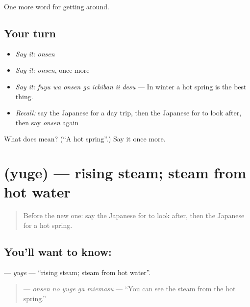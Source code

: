 \begin{grammarlens}[title={What you've built}]
One more word for getting around.
\end{grammarlens}

\subsection*{Your turn}
\begin{itemize}
\raggedright
  \item \emph{Say it:} \emph{onsen}
  \item \emph{Say it:} \emph{onsen}, once more
  \item \emph{Say it:} \emph{fuyu wa onsen ga ichiban ii desu} — In winter a hot spring is the best thing.
  \item \emph{Recall:} say the Japanese for a day trip, then the Japanese for to look after, then say \emph{onsen} again
\end{itemize}

\begin{tcolorbox}[breakable,colback=teal!4,colframe=teal!35!black,title={Before you move on}]
What does  mean? (\textquotedblleft{}A hot spring\textquotedblright{}.) Say it once more.
\end{tcolorbox}
\section[\texorpdfstring{\ja{ゆげ} (yuge)}{ゆげ (yuge)}]{ (yuge) — rising steam; steam from hot water}

\label{lesson:JA-C398-yuge}



\begin{quote}
Before the new one: say the Japanese for to look after, then the Japanese for a hot spring.
\end{quote}

\subsection*{You'll want to know: }
\textbf{} — \emph{yuge} — \textquotedblleft{}rising steam; steam from hot water\textquotedblright{}.

\begin{quote}
\textbf{  } — \emph{onsen no yuge ga miemasu} — \textquotedblleft{}You can see the steam from the hot spring.\textquotedblright{}
\end{quote}

